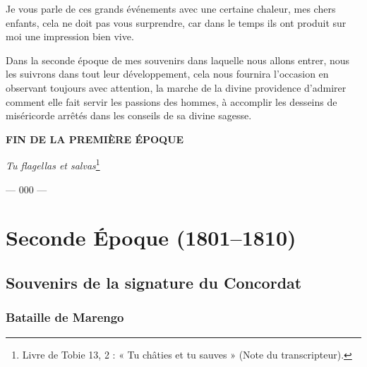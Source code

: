 \documentclass[11pt,a4paper]{report}
\begin{document}
Je vous parle de ces grands événements avec une certaine chaleur, mes chers
enfants, cela ne doit pas vous surprendre, car dans le temps ils ont produit sur
moi une impression bien vive.

Dans la seconde époque de mes souvenirs dans laquelle nous allons entrer, nous
les suivrons dans tout leur développement, cela nous fournira l'occasion en
observant toujours avec attention, la marche de la divine providence d'admirer
comment elle fait servir les passions des hommes, à accomplir les desseins de
miséricorde arrêtés dans les conseils de sa divine sagesse.

\vspace{1cm}

\begin{center} \textbf{FIN DE LA PREMIÈRE ÉPOQUE}

\vspace{0.5cm}

\textit{Tu flagellas et salvas}\footnote{Livre de Tobie 13, 2 : « Tu châties et tu sauves » (Note du transcripteur).}

\vspace{0.5cm}

--- 000 --- \end{center}

\part*{Seconde Époque (1801--1810)}

\chapter{Souvenirs de la signature du Concordat}

\section*{Bataille de Marengo}
\end{document}
